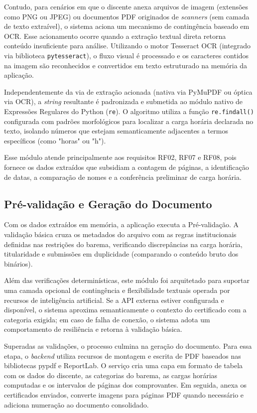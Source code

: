 Contudo, para cenários em que o discente anexa arquivos de imagem (extensões como PNG ou JPEG) ou documentos PDF originados de \textit{scanners} (sem camada de texto extraível), o sistema aciona um mecanismo de contingência baseado em OCR. Esse acionamento ocorre quando a extração textual direta retorna conteúdo insuficiente para análise. Utilizando o motor Tesseract OCR (integrado via biblioteca \texttt{pytesseract}), o fluxo visual é processado e os caracteres contidos na imagem são reconhecidos e convertidos em texto estruturado na memória da aplicação.

Independentemente da via de extração acionada (nativa via PyMuPDF ou óptica via OCR), a \textit{string} resultante é padronizada e submetida ao módulo nativo de Expressões Regulares do Python (\texttt{re}). O algoritmo utiliza a função \texttt{re.findall()} configurada com padrões morfológicos para localizar a carga horária declarada no texto, isolando números que estejam semanticamente adjacentes a termos específicos (como "horas" ou "h").

Esse módulo atende principalmente aos requisitos RF02, RF07 e RF08, pois fornece os dados extraídos que subsidiam a contagem de páginas, a identificação de datas, a comparação de nomes e a conferência preliminar de carga horária.

\subsection{Pré-validação e Geração do Documento}

Com os dados extraídos em memória, a aplicação executa a Pré-validação. A validação básica cruza os metadados do arquivo com as regras institucionais definidas nas restrições do barema, verificando discrepâncias na carga horária, titularidade e submissões em duplicidade (comparando o conteúdo bruto dos binários). 

Além das verificações determinísticas, este módulo foi arquitetado para suportar uma camada opcional de contingência e flexibilidade textuais operada por recursos de inteligência artificial. Se a API externa estiver configurada e disponível, o sistema aproxima semanticamente o contexto do certificado com a categoria exigida; em caso de falha de conexão, o sistema adota um comportamento de resiliência e retorna à validação básica.

Superadas as validações, o processo culmina na geração do documento. Para essa etapa, o \textit{backend} utiliza recursos de montagem e escrita de PDF baseados nas bibliotecas pypdf e ReportLab. O serviço cria uma capa em formato de tabela com os dados do discente, as categorias do barema, as cargas horárias computadas e os intervalos de páginas dos comprovantes. Em seguida, anexa os certificados enviados, converte imagens para páginas PDF quando necessário e adiciona numeração ao documento consolidado.

